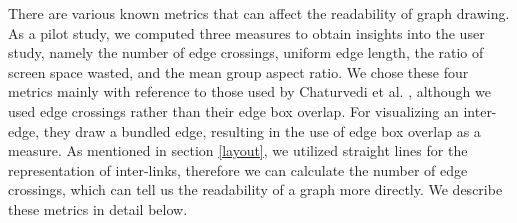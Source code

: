 \documentclass{vgtc}                          %
\begin{document}
There are various known metrics that can affect the readability of graph drawing.
As a pilot study, we computed three measures to obtain insights into the user study, namely the number of edge crossings, uniform edge length, the ratio of screen space wasted, and the mean group aspect ratio.
We chose these four metrics mainly with reference to those used by Chaturvedi et al. \cite{chaturvedi2014group}, although we used edge crossings rather than their edge box overlap.
For visualizing an inter-edge, they draw a bundled edge, resulting in the use of edge box overlap as a measure.
As mentioned in section \ref{layout}, we utilized straight lines for the representation of inter-links, therefore we can calculate the number of edge crossings, which can tell us the readability of a graph more directly.
We describe these metrics in detail below.
\end{document}
